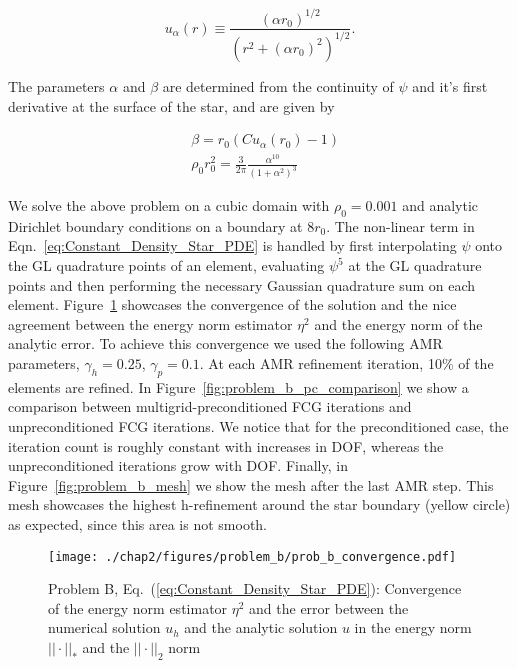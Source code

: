 \begin{equation}
u_{\alpha}(r) \equiv \frac{(\alpha r_0)^{1/2}}{(r^{2} + (\alpha r_0)^{2})^{1/2}}.
\end{equation}

The parameters $\alpha$ and $\beta$ are determined from the continuity of $\psi$ and it's first derivative at the surface of the star, and are given by

\begin{align}
 &\beta = r_0(Cu_{\alpha}(r_0) - 1) \\
 &\rho_{0}r_0^{2} = \frac{3}{2\pi}\frac{\alpha^{10}}{(1+\alpha^{2})^{3}}
\end{align}

We solve the above problem on a cubic domain with $\rho_0 =
0.001$ and analytic Dirichlet boundary conditions on a boundary at
$8r_0$. The non-linear term in Eqn.~\ref{eq:Constant_Density_Star_PDE} is handled by first interpolating $\psi$ onto the GL quadrature points of an element, evaluating $\psi^{5}$ at the GL quadrature points and then performing the necessary Gaussian quadrature sum on each element.
Figure~\ref{fig:problem_b_convergence} showcases the
convergence of the solution and the nice agreement between the
energy norm estimator $\eta^2$ and the energy norm of the analytic
error. To achieve this convergence we used the following AMR parameters, $\gamma_h = 0.25$, $\gamma_p = 0.1$.  At each AMR refinement iteration, 10\% of the elements are refined. In Figure~\ref{fig:problem_b_pc_comparison} we show a comparison between multigrid-preconditioned FCG iterations and unpreconditioned FCG iterations. We notice that for the preconditioned case, the iteration count is roughly constant with increases in DOF, whereas the unpreconditioned iterations grow with DOF. Finally, in Figure~\ref{fig:problem_b_mesh} we show the mesh after the last AMR step. This mesh showcases the highest h-refinement around the star boundary (yellow circle) as expected, since this area is not smooth. 
 
\begin{figure}[ht!]
  \centering
  \texttt{[image: ./chap2/figures/problem\_b/prob\_b\_convergence.pdf]}
  \caption{Problem B, Eq.~(\ref{eq:Constant_Density_Star_PDE}): Convergence of the energy norm estimator $\eta^2$ and the error between the numerical solution $u_h$ and the analytic solution $u$ in the energy norm $||\cdot||_*$ and the $||\cdot||_2$ norm}
  \label{fig:problem_b_convergence} 
\end{figure}

